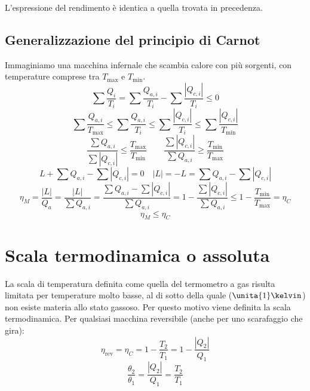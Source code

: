 L'espressione del rendimento è identica a quella trovata in precedenza.
\subsection{Generalizzazione del principio di Carnot}
Immaginiamo una macchina infernale che scambia calore con più sorgenti, con temperature comprese tra $T_{\max}$ e $T_{\min}$.
\begin{equation*}\sum\frac{Q_i}{T_i}=\sum\frac{Q_{a,i}}{T_i}-\sum\frac{|Q_{c,i}|}{T_i}\leq 0\end{equation*}
\begin{equation*}\sum\frac{Q_{a,i}}{T_{\max}} \leq \sum\frac{Q_{a,i}}{T_i}\leq\sum\frac{|Q_{c,i}|}{T_i}\leq\sum\frac{|Q_{c,i}|}{T_{\min}}\end{equation*}
\begin{equation*}\frac{\sum Q_{a,i}}{\sum|Q_{c,i}|}\leq\frac{T_{\max}}{T_{\min}}\qquad \frac{\sum |Q_{c,i}|}{\sum Q_{a,i}}\geq\frac{T_{\min}}{T_{\max}}\end{equation*}
\begin{equation*}L+\sum Q_{a,i}-\sum|Q_{c,i}|=0\quad |L|=-L=\sum Q_{a,i}-\sum|Q_{c,i}|\end{equation*}
\begin{equation*}\eta_M=\frac{|L|}{Q_a}=\frac{|L|}{\sum Q_{a,i}}=\frac{\sum Q_{a,i}-\sum |Q_{c,i}|}{\sum Q_{a,i}}=1-\frac{\sum|Q_{c,i}|}{\sum Q_{a,i}}\leq 1-\frac{T_{\min}}{T_{\max}}=\eta_C\end{equation*}
\begin{equation*}\eta_M\leq\eta_C\end{equation*}


\section{Scala termodinamica o assoluta}
La scala di temperatura definita come quella del termometro a gas risulta limitata per temperature molto basse, al di sotto della quale ($\unita{1}\kelvin$) non esiste materia allo stato gassoso. Per questo motivo viene definita la scala termodinamica. Per qualsiasi macchina reversibile (anche per uno scarafaggio che gira):
\begin{equation*}\eta_\text{rev}=\eta_C=1-\frac{T_2}{T_1}=1-\frac{|Q_2|}{Q_1}\end{equation*}
\begin{equation*}\frac{\theta_2}{\theta_1}=\frac{|Q_2|}{Q_1}=\frac{T_2}{T_1}\end{equation*}




